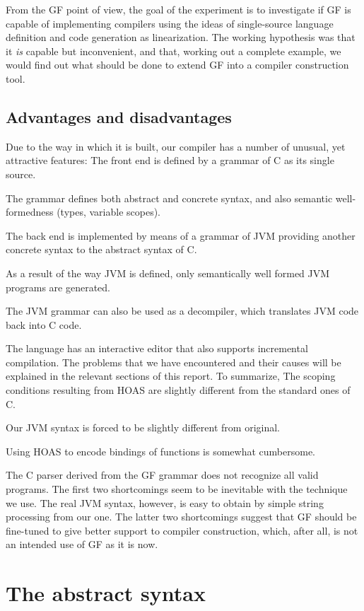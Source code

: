 \documentclass[12pt]{article}
\begin{document}
From the GF point of view, the goal of the experiment
is to investigate if GF is capable of implementing
compilers using the ideas of single-source language definition
and code generation as linearization. The working hypothesis
was that it \textit{is} capable but inconvenient, and that,
working out a complete example, we would find out what 
should be done to extend GF into a compiler construction tool.


\subsection{Advantages and disadvantages}

Due to the way in which it is built, our compiler has
a number of unusual, yet attractive features:
\bequ
The front end is defined by a grammar of C as its single source.

The grammar defines both abstract and concrete syntax, and also
semantic well-formedness (types, variable scopes).

The back end is implemented by means of a grammar of JVM providing
another concrete syntax to the abstract syntax of C.

As a result of the way JVM is defined, only semantically well formed
JVM programs are generated.

The JVM grammar can also be used as a decompiler, which translates
JVM code back into C code.

The language has an interactive editor that also supports incremental
compilation.
\enqu
The problems that we have encountered and their causes will be explained in 
the relevant sections of this report. To summarize,
\bequ
The scoping conditions resulting from HOAS are slightly different
from the standard ones of C.

Our JVM syntax is forced to be slightly different from original.

Using HOAS to encode bindings of functions is somewhat cumbersome.

The C parser derived from the GF grammar does not recognize all
valid programs.
\enqu
The first two shortcomings seem to be inevitable with the technique
we use. The real JVM syntax, however, is easy to obtain by simple
string processing from our one. The latter two shortcomings
suggest that GF should be fine-tuned to give better support
to compiler construction, which, after all, is not an intended
use of GF as it is now.


\section{The abstract syntax}
\end{document}
